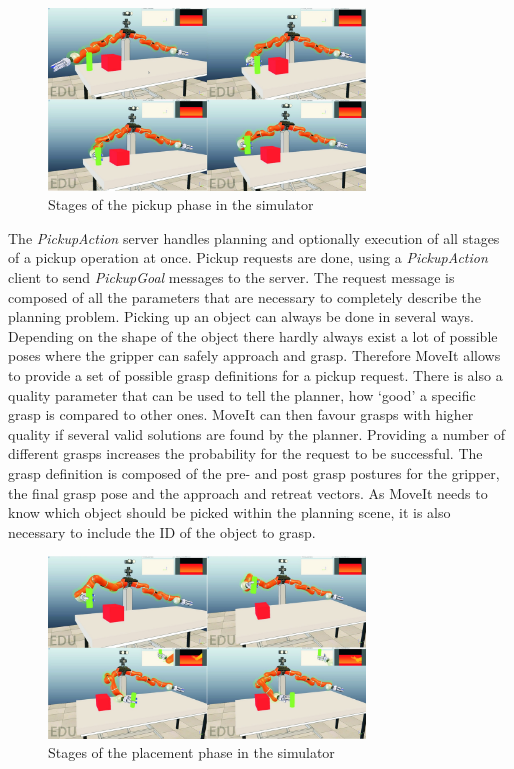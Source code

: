 \begin{figure}[h]
	\centering
  	\includegraphics[width=0.75\textwidth]{images/pickup.jpg}
	\caption{Stages of the pickup phase in the simulator}
	\label{fig:pickup}
\end{figure}

The \emph{PickupAction} server handles planning and optionally execution of all stages of a pickup operation at once. Pickup requests are done, using a \emph{PickupAction} client to send \emph{PickupGoal} messages to the server. The request message is composed of all the parameters that are necessary to completely describe the planning problem. Picking up an object can always be done in several ways. Depending on the shape of the object there hardly always exist a lot of possible poses where the gripper can safely approach and grasp. Therefore MoveIt allows to provide a set of possible grasp definitions for a pickup request. There is also a quality parameter that can be used to tell the planner, how `good' a specific grasp is compared to other ones. MoveIt can then favour grasps with higher quality if several valid solutions are found by the planner. Providing a number of different grasps increases the probability for the request to be successful. The grasp definition is composed of the pre- and post grasp postures for the gripper, the final grasp pose and the approach and retreat vectors. As MoveIt needs to know which object should be picked within the planning scene, it is also necessary to include the ID of the object to grasp.\\

\begin{figure}[h]
	\centering
  	\includegraphics[width=0.75\textwidth]{images/placement.jpg}
	\caption{Stages of the placement phase in the simulator}
	\label{fig:placement}
\end{figure}


